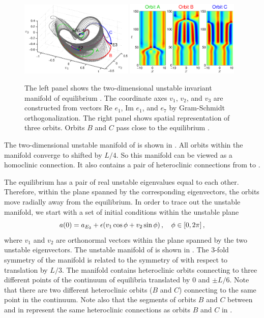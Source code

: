 \begin{figure}[h]
\begin{center} 
\includegraphics[width=0.48\textwidth]{figs/ks22_E2_manifold.eps}%
\includegraphics[width=0.48\textwidth]{figs/ks22_E2_orbits.eps}
\end{center}
\caption{
The left panel shows the two-dimensional
unstable invariant manifold of equilibrium . The coordinate axes
$v_1$, $v_2$, and $v_3$ are constructed from vectors
Re $e_1$, Im $e_1$, and $e_7$ by Gram-Schmidt orthogonalization.
The right panel shows spatial representation of three orbits. Orbits
$B$ and $C$ pass close to the equilibrium .}
\label{f:KS22E2man}
\end{figure}

The two-dimensional unstable manifold of  is shown in
.  All orbits within the manifold converge
to  shifted by $L/4$.  So this manifold can be viewed as a homoclinic
connection.  It also contains a pair of heteroclinic connections from
 to .

The equilibrium  has a pair of real unstable eigenvalues
equal to each other.  Therefore, within the plane spanned by the
corresponding eigenvectors, the orbits move radially away from
the equilibrium.  In order to trace out the unstable manifold,
we start with a set of initial conditions within the unstable plane
\[ a(0) = a_{{E_{3}}} + \epsilon(v_1 \cos \phi + v_2 \sin \phi)\,,
  \quad\phi\in[0,2\pi]\,, \]
where $v_1$ and $v_2$ are orthonormal vectors within the
plane spanned by the two unstable eigenvectors.  The unstable manifold
of  is shown in .  The 3-fold symmetry of
the manifold is related to the symmetry of  with respect to
translation by $L/3$.  The manifold contains heteroclinic orbits
connecting  to three different points of the continuum of equilibria 
translated by 0 and $\pm L/6$.  Note that there are two different
heteroclinic orbits ($B$ and $C$) connecting  to the same point in the 
 continuum.  Note also that the segments of orbits $B$ and $C$
between  and  in 
represent the same heteroclinic connections as orbits $B$ and $C$ in
.

